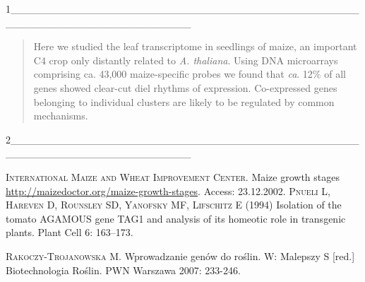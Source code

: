 \begin{comment}
Układanka --- uporządkuj (przekopiuj) fragmenty tekstu (ograniczone pozomymi kreskami) aby w Overleaf został wygenerowany dokument bez błędów. Fragmenty są ponumerowane, dla ułatwienia orientacji.
Po wygenerowaniu dokumentu rozwiąż pytania oznaczone liczbami w nawiasach zwykłych. Zadbaj, żeby nie było błędów w dokumencie. ,,Rozwiązany'' plik prześlij jako odpowiedź na zadanie w Moodle.
\end{comment}

1________________________________________________________________________

\begin{abstract}%
Here we studied the leaf transcriptome in seedlings of maize, an important C4 crop only distantly related to \textit{A. thaliana}. Using \uppercase{dna} microarrays comprising ca. 43,000 maize-specific probes we found that \textit{ca}. 12\% of all genes showed clear-cut diel rhythms of expression. Co-expressed genes belonging to individual clusters are likely to be regulated by common mechanisms.\\
\end{abstract}

\begin{comment}
To jest komentarz wielowierszowy. Dokument ma pokazac ogolna skladnie dokumentu klasy article. Stosowany jest tu najprostszy sposob cytowania. W tekscie uzyte tez sa rozne polecenia.
\end{comment}

2________________________________________________________________________

\begin{thebibliography}{7}%
 \textsc{International Maize and Wheat Improvement Center.} Maize growth stages \url{http://maizedoctor.org/maize-growth-stages}. Access: 23.12.2002.
 \textsc{Pnueli L, Hareven D, Rounsley SD, Yanofsky MF, Lifschitz E} (1994) Isolation of the tomato AGAMOUS gene TAG1 and analysis of its homeotic role in transgenic plants. Plant Cell 6: 163–173.

 \textsc{Rakoczy-Trojanowska M.} Wprowadzanie genów do roślin. W: Malepszy S [red.] Biotechnologia Roślin. PWN Warszawa 2007: 233-246.
\end{thebibliography}
\begin{comment}
(4) pozmieniaj formatowanie wpisow, uzywajac komend uzywanych wczesniej w dokumencie. (20) dodaj pozycje literatury (wymyslona)
\end{comment}

